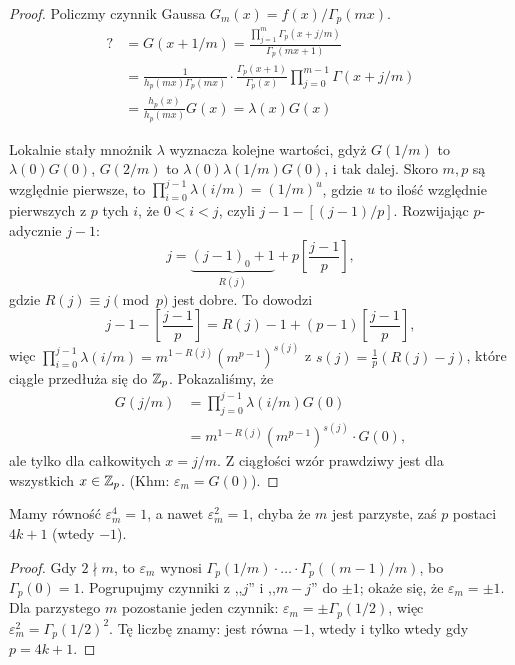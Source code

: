 \begin{proof}
	Policzmy czynnik Gaussa $G_m(x) = f(x)/\Gamma_p(mx)$.
	\begin{align*}
	? & = G(x+1/m) = \frac{\prod_{j=1}^m \Gamma_p(x+j/m)}{\Gamma_p(mx+1)} \\
	& = \frac{1}{h_p(mx)\Gamma_p(mx)} \cdot \frac{\Gamma_p(x+1)}{\Gamma_p(x)} \prod_{j=0}^{m-1} \Gamma(x+j/m)  \\
	& = \frac{h_p(x)}{h_p(mx)}G(x) = \lambda(x) G(x)
	\end{align*}

	Lokalnie stały mnożnik $\lambda$ wyznacza kolejne wartości, gdyż $G(1/m)$ to $\lambda(0) G(0)$, $G(2/m)$ to $\lambda(0)\lambda(1/m) G(0)$, i tak dalej.
	Skoro $m,p$ są względnie pierwsze, to $\prod_{i=0}^{j-1} \lambda(i/m) = (1/m)^u$, gdzie $u$ to ilość względnie pierwszych z $p$ tych $i$, że $0 < i < j$, czyli $j-1 - [(j-1)/p]$.
	Rozwijając $p$-adycznie $j-1$:
	\[
		j = \underbrace{(j-1)_0 + 1}_{R(j)}+ p \left[ \frac{j-1}p\right],
	\]
	gdzie $R(j) \equiv j \pmod p$ jest dobre.
	To dowodzi
	\[
		j-1 - \left[\frac{j-1}p \right] = R(j) -1 + (p-1) \left[\frac{j-1}p\right],
	\]
	więc $\prod_{i=0}^{j-1} \lambda(i/m) = m^{1-R(j)}(m^{p-1})^{s(j)}$ z $s(j) = \frac 1p (R(j)-j)$, które ciągle przedłuża się do $\mathbb Z_p$.
	Pokazaliśmy, że
	\begin{align*}
		G(j/m) & = \prod_{j=0}^{j-1} \lambda(i/m) G(0) \\
		& = m^{1-R(j)} (m^{p-1})^{s(j)} \cdot G(0),
	\end{align*}
	ale tylko dla całkowitych $x = j/m$.
	Z ciągłości wzór prawdziwy jest dla wszystkich $x \in \mathbb Z_p$.
	(Khm: $\varepsilon_m = G(0)$).
\end{proof}

\begin{lemat}
	Mamy równość $\varepsilon_m^4 = 1$, a nawet $\varepsilon_m^2= 1$, chyba że $m$ jest parzyste, zaś $p$ postaci $4k+1$ (wtedy $-1$).
\end{lemat}

\begin{proof}
	Gdy $2 \nmid m$, to $\varepsilon_m$ wynosi $\Gamma_p(1/m)\cdot \ldots \cdot \Gamma_p((m-1)/m)$, bo $\Gamma_p(0)= 1$.
	Pogrupujmy czynniki z ,,$j$'' i ,,$m-j$'' do $\pm 1$; okaże się, że $\varepsilon_m = \pm 1$.
	Dla parzystego $m$ pozostanie jeden czynnik: $\varepsilon_m = \pm \Gamma_p(1/2)$, więc $\varepsilon_m^2 = \Gamma_p(1/2)^2$.
	Tę liczbę znamy: jest równa $-1$, wtedy i tylko wtedy gdy $p = 4k+1$.
\end{proof}

